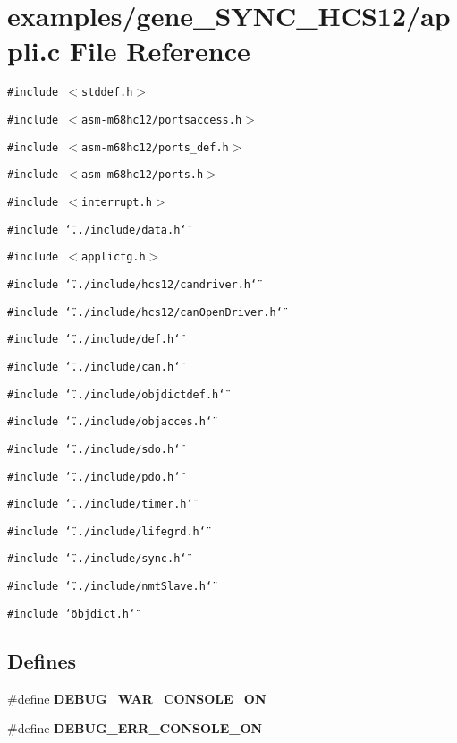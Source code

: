 \section{examples/gene\_\-SYNC\_\-HCS12/appli.c File Reference}
\label{appli_8c}
{\tt \#include $<$stddef.h$>$}\par
{\tt \#include $<$asm-m68hc12/portsaccess.h$>$}\par
{\tt \#include $<$asm-m68hc12/ports\_\-def.h$>$}\par
{\tt \#include $<$asm-m68hc12/ports.h$>$}\par
{\tt \#include $<$interrupt.h$>$}\par
{\tt \#include \char`\"{}../include/data.h\char`\"{}}\par
{\tt \#include $<$applicfg.h$>$}\par
{\tt \#include \char`\"{}../include/hcs12/candriver.h\char`\"{}}\par
{\tt \#include \char`\"{}../include/hcs12/can\-Open\-Driver.h\char`\"{}}\par
{\tt \#include \char`\"{}../include/def.h\char`\"{}}\par
{\tt \#include \char`\"{}../include/can.h\char`\"{}}\par
{\tt \#include \char`\"{}../include/objdictdef.h\char`\"{}}\par
{\tt \#include \char`\"{}../include/objacces.h\char`\"{}}\par
{\tt \#include \char`\"{}../include/sdo.h\char`\"{}}\par
{\tt \#include \char`\"{}../include/pdo.h\char`\"{}}\par
{\tt \#include \char`\"{}../include/timer.h\char`\"{}}\par
{\tt \#include \char`\"{}../include/lifegrd.h\char`\"{}}\par
{\tt \#include \char`\"{}../include/sync.h\char`\"{}}\par
{\tt \#include \char`\"{}../include/nmt\-Slave.h\char`\"{}}\par
{\tt \#include \char`\"{}objdict.h\char`\"{}}\par
\subsection*{Defines}
\begin{CompactItemize}
\item 
\#define {\bf DEBUG\_\-WAR\_\-CONSOLE\_\-ON}
\item 
\#define {\bf DEBUG\_\-ERR\_\-CONSOLE\_\-ON}
\end{CompactItemize}

